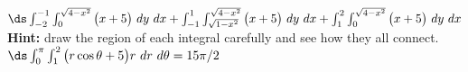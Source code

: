 {$\ds \int_{-2}^{-1}\int_{0}^{\sqrt{4-x^2}} \big(x+5\big)\ dy\ dx+\int_{-1}^{1}\int_{\sqrt{1-x^2}}^{\sqrt{4-x^2}} \big(x+5\big)\ dy\ dx +\int_{1}^{2}\int_{0}^{\sqrt{4-x^2}} \big(x+5\big)\ dy\ dx$\\[5pt]
\textbf{Hint:} draw the region of each integral carefully and see how they all connect.
}
{$\ds \int_{0}^{\pi}\int_{1}^{2} \big(r\cos\theta+5\big)r\ dr\ d\theta=15\pi/2$
}
